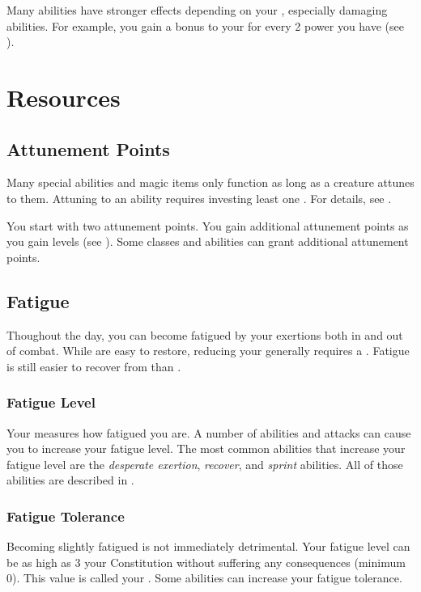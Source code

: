     Many abilities have stronger effects depending on your , especially damaging abilities.
    For example, you gain a  bonus to your  for every 2 power you have (see ).

\section{Resources}\label{Resources}

  \subsection{Attunement Points}\label{Attunement Points}
    Many special abilities and magic items only function as long as a creature attunes to them.
    Attuning to an ability requires investing least one .
    For details, see .

    You start with two attunement points.
    You gain additional attunement points as you gain levels (see ).
    Some classes and abilities can grant additional attunement points.

  \subsection{Fatigue}\label{Fatigue}
    Thoughout the day, you can become fatigued by your exertions both in and out of combat.
    While  are easy to restore, reducing your  generally requires a .
    Fatigue is still easier to recover from than .

    \subsubsection{Fatigue Level}\label{Fatigue Level}
      Your  measures how fatigued you are.
      A number of abilities and attacks can cause you to increase your fatigue level.
      The most common abilities that increase your fatigue level are the \textit{desperate exertion}, \textit{recover}, and \textit{sprint} abilities.
      All of those abilities are described in .

    \subsubsection{Fatigue Tolerance}\label{Fatigue Tolerance}
      Becoming slightly fatigued is not immediately detrimental.
      Your fatigue level can be as high as 3 \add your Constitution without suffering any consequences (minimum 0).
      This value is called your .
      Some abilities can increase your fatigue tolerance.

